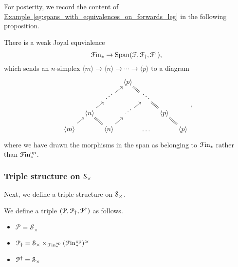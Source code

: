 \documentclass[main.tex]{subfiles}
\begin{document}
For posterity, we record the content of \hyperref[eg:spans_with_equivalences_on_forwards_leg]{Example~\ref*{eg:spans_with_equivalences_on_forwards_leg}} in the following proposition.

\begin{lemma}
  There is a weak Joyal equvialence
  \begin{equation*}
    \Finp \to \Span\triple{F},
  \end{equation*}
  which sends an $n$-simplex $\langle m \rangle \to \langle n \rangle \to \cdots \to \langle p \rangle$ to a diagram
  \begin{equation*}
    \begin{tikzcd}[row sep=small, column sep=tiny]
      &&& \respace{\langle p \rangle}
      \\
      && \respace{\iddots}
      \arrow[ur]
      && \respace{\ddots}
      \arrow[ul, equals]
      \\
      & \respace{\langle n \rangle}
      \arrow[ur]
      && \respace{\iddots}
      \arrow[ur]
      && \respace{\langle p \rangle}
      \arrow[ul, equals]
      \\
      \langle m \rangle
      \arrow[ur]
      && \respace{\langle n \rangle}
      \arrow[ul, equals]
      \arrow[ur]
      && \respace{\dots}
      && \respace{\langle p \rangle}
      \arrow[ul, equals]
    \end{tikzcd},
  \end{equation*}
  where we have drawn the morphisms in the span as belonging to $\Finp$ rather than $\Finp\op$.
\end{lemma}

\subsubsection*{Triple structure on \texorpdfstring{$\S_{\times}$}{S}}

Next, we define a triple structure on $\S_{\times}$.

\begin{definition}
  We define a triple $\triple{P}$ as follows.
  \begin{itemize}
    \item $\mathcal{P} = \mathcal{S}_{\times}$

    \item $\mathcal{P}\downdag = \mathcal{S}_{\times} \times_{\Finp\op} (\Finp\op)^{\simeq}$

    \item $\mathcal{P}\updag = \mathcal{S}_{\times}$
  \end{itemize}
\end{definition}
\end{document}
